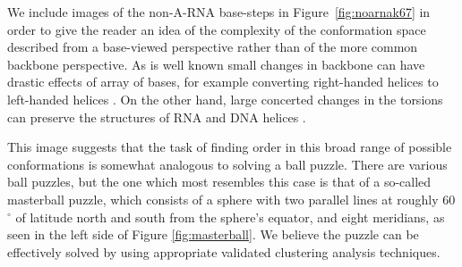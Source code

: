 We    include    images     of    the    non-A-RNA    base-steps    in
Figure~\ref{fig:noarnak67} in order to give  the reader an idea of the
complexity  of the  conformation  space described  from a  base-viewed
perspective rather  than of the more common  backbone perspective.  As
is well  known small changes in  backbone can have  drastic effects of
array  of  bases,  for  example  converting  right-handed  helices  to
left-handed helices \cite{olson1976}.  On the other hand, large
concerted changes in  the torsions can preserve the  structures of RNA
and DNA helices \cite{olson1981}.

This image suggests that the task of finding order in this broad range
of  possible conformations  is somewhat  analogous to  solving  a ball
puzzle.   There are  various  ball  puzzles, but  the  one which  most
resembles this  case is that  of a so-called masterball  puzzle, which
consists of a  sphere with two parallel lines  at roughly 60$^{\circ}$
of  latitude north  and south  from  the sphere's  equator, and  eight
meridians, as seen in the left side of Figure \ref{fig:masterball}. We
believe  the puzzle  can be  effectively solved  by  using appropriate
validated clustering analysis techniques.


